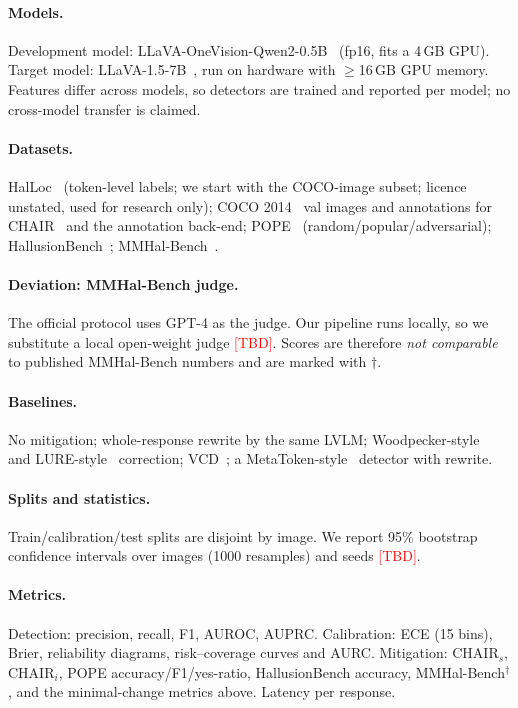 \documentclass[11pt]{article}
\newcommand{\TBD}{\textcolor{red}{[TBD]}}
\begin{document}
\paragraph{Models.} Development model: LLaVA-OneVision-Qwen2-0.5B~\cite{li2024llavaonevision} (fp16, fits a 4\,GB GPU). Target model: LLaVA-1.5-7B~\cite{liu2024llava15}, run on hardware with $\ge$16\,GB GPU memory. Features differ across models, so detectors are trained and reported per model; no cross-model transfer is claimed.
\paragraph{Datasets.} HalLoc~\cite{park2025halloc} (token-level labels; we start with the COCO-image subset; licence unstated, used for research only); COCO 2014~\cite{lin2014coco} val images and annotations for CHAIR~\cite{rohrbach2018chair} and the annotation back-end; POPE~\cite{li2023pope} (random/popular/adversarial); HallusionBench~\cite{guan2024hallusionbench}; MMHal-Bench~\cite{sun2024llavarlhf}.
\paragraph{Deviation: MMHal-Bench judge.} The official protocol uses GPT-4 as the judge. Our pipeline runs locally, so we substitute a local open-weight judge \TBD{}. Scores are therefore \emph{not comparable} to published MMHal-Bench numbers and are marked with $\dagger$.
\paragraph{Baselines.} No mitigation; whole-response rewrite by the same LVLM; Woodpecker-style~\cite{yin2024woodpecker} and LURE-style~\cite{zhou2024lure} correction; VCD~\cite{leng2024vcd}; a MetaToken-style~\cite{fieback2024metatoken} detector with rewrite.
\paragraph{Splits and statistics.} Train/calibration/test splits are disjoint by image. We report 95\% bootstrap confidence intervals over images (1000 resamples) and seeds \TBD{}.
\paragraph{Metrics.} Detection: precision, recall, F1, AUROC, AUPRC. Calibration: ECE (15 bins), Brier, reliability diagrams, risk--coverage curves and AURC. Mitigation: CHAIR$_s$, CHAIR$_i$, POPE accuracy/F1/yes-ratio, HallusionBench accuracy, MMHal-Bench$^\dagger$, and the minimal-change metrics above. Latency per response.
\end{document}
